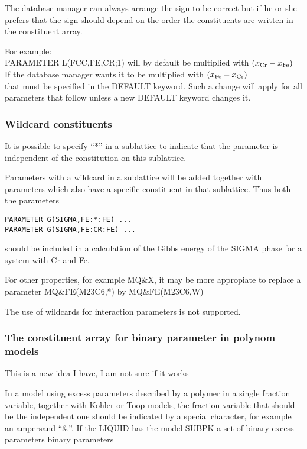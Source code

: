 \documentclass[12pt]{article}
\begin{document}
The database manager can always arrange the sign to be correct but if
he or she prefers that the sign should depend on the order the
constituents are written in the constituent array.

For example:\\ PARAMETER L(FCC,FE,CR;1) will by default be multiplied
with $(x_{\rm Cr}-x_{\rm Fe})$\\ If the database manager wants it to
be multiplied with $(x_{\rm Fe}-x_{\rm Cr})$\\ that must be specified
in the DEFAULT keyword.  Such a change will apply for all parameters
that follow unless a new DEFAULT keyword changes it.

\subsubsection{Wildcard constituents}

It is possible to specify ``*'' in a sublattice to indicate that the
parameter is independent of the constitution on this sublattice.

Parameters with a wildcard in a sublattice will be added together with
parameters which also have a specific constituent in that sublattice.
Thus both the parameters

\begin{verbatim}
PARAMETER G(SIGMA,FE:*:FE) ...
PARAMETER G(SIGMA,FE:CR:FE) ...
\end{verbatim}

should be included in a calculation of the Gibbs energy of the SIGMA
phase for a system with Cr and Fe.

For other properties, for example MQ\&X, it may be more appropiate to
replace a parameter MQ\&FE(M23C6,*) by MQ\&FE(M23C6,W)

The use of wildcards for interaction parameters is not supported.

\subsubsection{The constituent array for binary parameter 
in polynom models}\label{sec:excesspolynom}

{\rm This is a new idea I have, I am not sure if it works}

In a model using excess parameters described by a polymer in a single
fraction variable, together with Kohler or Toop models, the fraction
variable that should be the independent one should be indicated by
a special character, for example an ampersand ``\&''.  If the LIQUID
has the model SUBPK a set of binary excess parameters
binary parameters
\end{document}
